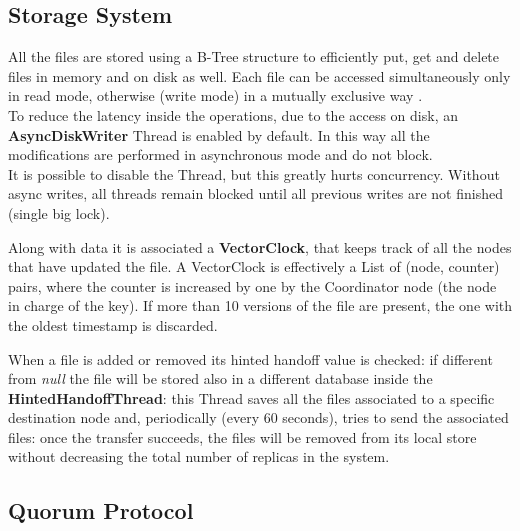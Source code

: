 \documentclass[12pt, a4paper, oneside] {book}
\begin{document}
\subsection{Storage System}

All the files are stored using a B-Tree structure to efficiently put, get and delete files in memory and on disk as well.
Each file can be accessed simultaneously only in read mode, otherwise (write mode) in a mutually exclusive way \cite{rif2}.\\
To reduce the latency inside the operations, due to the access on disk, an \textbf{AsyncDiskWriter} Thread is enabled by default.
In this way all the modifications are performed in asynchronous mode and do not block.\\
It is possible to disable the Thread, but this greatly hurts concurrency. Without async writes, all threads remain blocked until all previous writes are not finished (single big lock).

Along with data it is associated a \textbf{VectorClock}, that keeps track of all the nodes that have updated the file.
A VectorClock is effectively a List of (node, counter) pairs, where the counter is increased by one by the Coordinator node (the node in charge of the key).
If more than 10 versions of the file are present, the one with the oldest timestamp is discarded.


When a file is added or removed its hinted handoff value is checked: if different from \emph{null} the file will be stored also in a different database inside the \textbf{HintedHandoffThread}:
this Thread saves all the files associated to a specific destination node and, periodically (every 60 seconds), tries to send the associated files:
once the transfer succeeds, the files will be removed from its local store without decreasing the total number of replicas in the system.

\subsection{Quorum Protocol}
\end{document}
